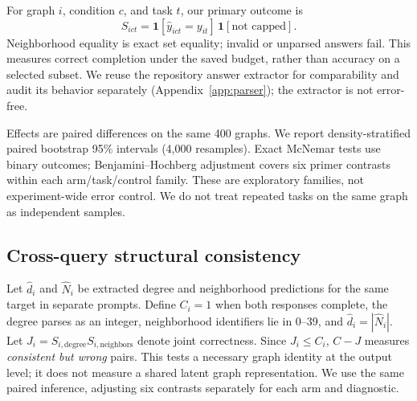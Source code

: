 \documentclass[11pt]{article}
\begin{document}
For graph $i$, condition $c$, and task $t$, our primary outcome is
\begin{equation}
 S_{ict}=\mathbf{1}[\hat y_{ict}=y_{it}]\,\mathbf{1}[\text{not capped}].
\end{equation}
Neighborhood equality is exact set equality; invalid or unparsed answers fail. This measures correct completion under the saved budget, rather than accuracy on a selected subset. We reuse the repository answer extractor for comparability and audit its behavior separately (Appendix~\ref{app:parser}); the extractor is not error-free.

Effects are paired differences on the same 400 graphs. We report density-stratified paired bootstrap 95\% intervals (4,000 resamples). Exact McNemar tests \citep{mcnemar1947} use binary outcomes; Benjamini--Hochberg adjustment \citep{benjamini1995} covers six primer contrasts within each arm/task/control family. These are exploratory families, not experiment-wide error control. We do not treat repeated tasks on the same graph as independent samples.

\subsection{Cross-query structural consistency}
Let $\hat d_i$ and $\hat N_i$ be extracted degree and neighborhood predictions for the same target in separate prompts. Define $C_i=1$ when both responses complete, the degree parses as an integer, neighborhood identifiers lie in 0--39, and $\hat d_i=|\hat N_i|$. Let $J_i=S_{i,\mathrm{degree}}S_{i,\mathrm{neighbors}}$ denote joint correctness. Since $J_i\leq C_i$, $C-J$ measures \emph{consistent but wrong} pairs. This tests a necessary graph identity at the output level; it does not measure a shared latent graph representation. We use the same paired inference, adjusting six contrasts separately for each arm and diagnostic.

\begin{table}[t]
\centering\small

\caption{Main 40-node sweep: no-primer success (\%) and changes in percentage points for each primer, pooled equally across four densities ($n=400$ per cell). T denotes native thinking. Success requires an exact, uncapped answer. $^*$: paired McNemar BH-adjusted $q<.05$ within the six comparisons for that arm/task. Comp. is component count; Clust. is local clustering. Negative effects are retained. Full intervals and cell counts accompany the paper.}
\label{tab:main}
\end{table}
\end{document}
